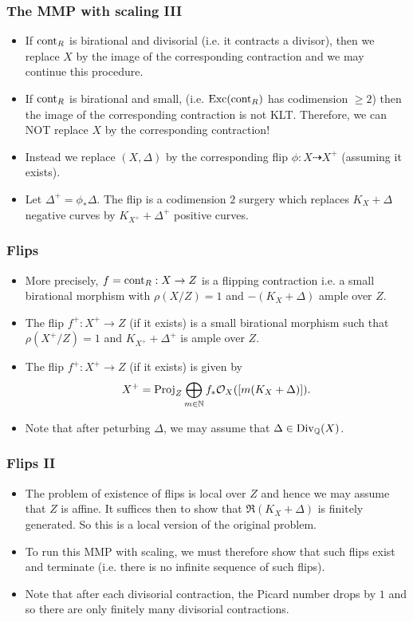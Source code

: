 \documentclass{beamer}
\theoremstyle{plain}
\theoremstyle{definition}
\theoremstyle{remark}
\def\Q{\mathbb {Q}}
\def\OO{\mathcal {O}}
\begin{document}
\begin{frame}
\frametitle{The MMP with scaling III}
\begin{itemize}
\item If ${\rm cont}_R$ is birational and divisorial (i.e. it contracts a divisor), then we replace $X$ by the image of the corresponding contraction and we may continue this procedure.
\item If ${\rm cont}_R$ is birational and small, (i.e. ${\rm Exc}({\rm cont}_R)$ has codimension $\geq 2$) then the image of the corresponding contraction
is not KLT. Therefore, we can NOT replace $X$ by the corresponding contraction!
\item Instead we replace $(X,\Delta)$ by the corresponding flip 
$\phi :X\dasharrow
X^+$ (assuming it exists).
\item Let $\Delta ^+=\phi _* \Delta$. The flip is a codimension $2$ surgery 
which replaces $K_X+\Delta$ negative curves by
 $K_{X^+}+\Delta^+$ positive curves.
\end{itemize}
\end{frame}

\begin{frame}
 \frametitle{Flips}
\begin{itemize}
\item More precisely, $f={\rm cont} _R:X\to Z$ is a flipping contraction i.e. a small birational morphism with $\rho (X/Z)=1$ and $-(K_X+\Delta)$ ample over $Z$.
\item The flip $f^+:X^+\to Z$ (if it exists) is a small birational morphism such that $\rho (X^+/Z)=1$ and $K_{X^+}+\Delta  ^+$ is  ample over $Z$.
\item The flip $f^+:X^+\to Z$ (if it exists) is given by
$$X^+={\rm Proj}_Z \bigoplus_{m\in \mathbb {N}} f_*\OO _X( [m(K_X+\Delta)]).$$
\item Note that after peturbing $\Delta$, we may assume that $\Delta \in{\rm Div }_\Q (X)$.
\end{itemize}

\end{frame}
\begin{frame}
 \frametitle{Flips II}
\begin{itemize}
\item The problem of existence of flips is local over $Z$ and hence we may
assume that $Z$ is affine. It suffices then to show that
$\mathfrak{R}(K_X+\Delta)$ is finitely generated.
So this is a local version of the original problem.
\item To run this MMP with scaling, we must therefore show that such flips
exist and terminate (i.e. there is no infinite sequence of such flips).
\item Note that after each divisorial contraction, the Picard number drops by $1$ and so there are only finitely many divisorial contractions.
\end{itemize}

\end{frame}
\end{document}
